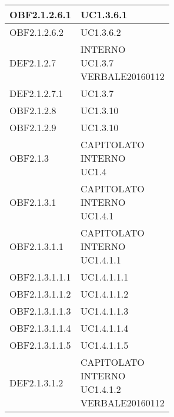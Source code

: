 \documentclass{scalatekids-article}
\begin{document}
\begin{longtable}[H]{|p{5.5cm}|p{5.5cm}|}
  \hline
  OBF2.1.2.6.1 & \multiLineCell[t]{UC1.3.6.1\\}\\
  \hline
  OBF2.1.2.6.2 & \multiLineCell[t]{UC1.3.6.2\\}\\
  \hline
  DEF2.1.2.7 & \multiLineCell[t]{INTERNO\\UC1.3.7\\VERBALE20160112\\}\\
  \hline
  DEF2.1.2.7.1 & \multiLineCell[t]{UC1.3.7\\}\\
  \hline
  OBF2.1.2.8 & \multiLineCell[t]{UC1.3.10\\}\\
  \hline
  OBF2.1.2.9 & \multiLineCell[t]{UC1.3.10\\}\\
  \hline
  OBF2.1.3 & \multiLineCell[t]{CAPITOLATO\\INTERNO\\UC1.4\\}\\
  \hline
  OBF2.1.3.1 & \multiLineCell[t]{CAPITOLATO\\INTERNO\\UC1.4.1\\}\\
  \hline
  OBF2.1.3.1.1 & \multiLineCell[t]{CAPITOLATO\\INTERNO\\UC1.4.1.1\\}\\
  \hline
  OBF2.1.3.1.1.1 & \multiLineCell[t]{UC1.4.1.1.1\\}\\
  \hline
  OBF2.1.3.1.1.2 & \multiLineCell[t]{UC1.4.1.1.2\\}\\
  \hline
  OBF2.1.3.1.1.3 & \multiLineCell[t]{UC1.4.1.1.3\\}\\
  \hline
  OBF2.1.3.1.1.4 & \multiLineCell[t]{UC1.4.1.1.4\\}\\
  \hline
  OBF2.1.3.1.1.5 & \multiLineCell[t]{UC1.4.1.1.5\\}\\
  \hline
  DEF2.1.3.1.2 & \multiLineCell[t]{CAPITOLATO\\INTERNO\\UC1.4.1.2\\VERBALE20160112\\}\\

\end{longtable}
\end{document}
